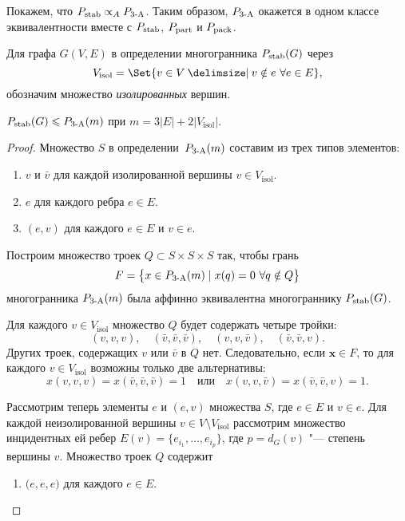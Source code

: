 Покажем, что $P_{\textup{stab}} \propto_A P_{\textup{3-A}}$.
Таким образом, $P_{\textup{3-A}}$ окажется в одном классе эквивалентности 
вместе с $P_{\textup{stab}}$, $P_{\textup{part}}$ и $P_{\textup{pack}}$.

Для графа $G(V, E)$ в определении многогранника $P_{\textup{stab}}(G)$ через
\[
V_{\text{isol}} = \Set{v\in V \given v\notin e \  \forall e\in E},
\]
обозначим множество \emph{изолированных} вершин.


\begin{theorem}
	\label{TheSSP-3AP}
	$P_{\textup{stab}}(G) \leqslant P_{\textup{3-A}}(m)$ при $m = 3|E| + 2|V_{\text{isol}}|$.
\end{theorem}

\begin{proof}
	Множество $S$ в определении~$P_{\textup{3-A}}(m)$ составим из трех типов элементов:
	\begin{enumerate}
		\item $v$ и $\bar{v}$ для каждой изолированной вершины $v\in V_{\text{isol}}$.
		
		\item $e$ для каждого ребра $e\in E$.
		
		\item $(e, v)$ для каждого $e\in E$ и $v \in e$.
	\end{enumerate}
	Построим множество троек $Q \subset S\times S\times S$ так, чтобы грань
	\[
	F = \big\{x \in P_{\textup{3-A}}(m) \mid x(q) = 0 \ \forall q \notin Q\big\}
	\] 
	многогранника $P_{\textup{3-A}}(m)$ была аффинно эквивалентна многограннику $P_{\textup{stab}}(G)$.
	
	Для каждого $v\in V_{\text{isol}}$ множество $Q$ будет содержать четыре тройки:
	\[
	(v, v, v), \quad (\bar{v}, \bar{v}, \bar{v}), \quad
	(v, v, \bar{v}), \quad (\bar{v}, \bar{v}, v).
	\] 
	Других троек, содержащих $v$ или $\bar{v}$ в $Q$ нет.
	Следовательно, если $\bm{x} \in F$, то для каждого $v\in V_{\text{isol}}$ возможны только две альтернативы: 
	\[
	x(v, v, v) = x(\bar{v}, \bar{v}, \bar{v}) = 1
	\quad \text{или} \quad 
	x(v, v, \bar{v}) = x(\bar{v}, \bar{v}, v) = 1.
	\] 
	
	Рассмотрим теперь элементы $e$ и $(e, v)$ множества $S$,
	где $e\in E$ и $v \in e$.
	Для каждой неизолированной вершины $v \in V \setminus V_{\text{isol}}$ рассмотрим множество инцидентных ей ребер $E(v) = \{e_{i_1}, \ldots, e_{i_p}\}$, где $p=d_G(v)$ "--- степень вершины $v$.
	Множество троек $Q$ содержит
	\begin{enumerate} 
		\item $\big( e, e, e \big)$ для каждого $e\in E$.
		

\end{enumerate}
\end{proof}
